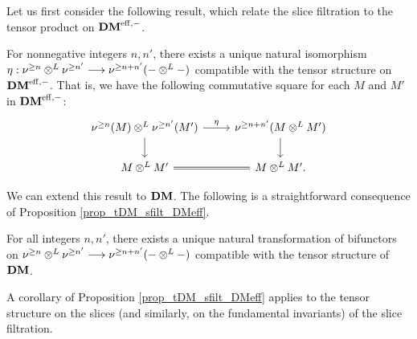 Let us first consider the following result, which relate the slice 
filtration to the tensor product on $\mathbf{DM}^{\mathrm{eff},-}$.

\begin{prop}\label{prop_tDM_sfilt_DMeff}
For nonnegative integers $n, n'$, there exists a unique natural
isomorphism $\eta: \nu^{\geq n} \otimes^L \nu^{\geq n'} \longrightarrow \nu^{\geq n + n'}(- 
\otimes^L -)$ compatible with the tensor structure on $\mathbf{DM}^{\mathrm{eff},-}$. That 
is, we have the following commutative square for each $M$ and
$M'$ in $\mathbf{DM}^{\mathrm{eff},-}$:
\[
\begin{tikzcd}
\sgDM{n}(M) \tDM \sgDM{n'}(M') \arrow{r}{\eta} \arrow{d} &
\sgDM{n + n'}(M \tDM M') \arrow{d} \\
M \tDM M' \arrow[equals]{r} &
M \tDM M'.
\end{tikzcd}
\]
\end{prop}

We can extend this result to $\mathbf{DM}$. The following is a
straightforward consequence of Proposition 
\ref{prop_tDM_sfilt_DMeff}.

\begin{cor}\label{cor_tDM_sfilt_DM}
For all integers $n, n'$, there exists a unique natural 
transformation of bifunctors on $\nu^{\geq n} \otimes^L \nu^{\geq n'} \longrightarrow 
\nu^{\geq n + n'}(- \otimes^L -)$ compatible with the tensor structure of 
$\mathbf{DM}$.
\end{cor}

A corollary of Proposition \ref{prop_tDM_sfilt_DMeff} applies to 
the tensor structure on the slices (and similarly, on the 
fundamental invariants) of the slice filtration.

